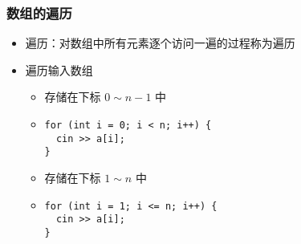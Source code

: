 
\begin{frame}[fragile]
    \frametitle{数组的遍历}

    \begin{overlayarea}{\textwidth}{.66\textheight}
        \begin{itemize}
            \item 遍历：对数组中所有元素逐个访问一遍的过程称为遍历

            \item 遍历输入数组

                \begin{itemize}
                    \item<1-> 存储在下标 $0 \sim n - 1$ 中
                    \item<1-> \lstinline|for (int i = 0; i < n; i++) {|\\
                        \lstinline|  cin >> a[i];|\\
                        \lstinline|}|
                    \item<2-> 存储在下标 $1 \sim n$ 中
                    \item<2-> \lstinline|for (int i = 1; i <= n; i++) {|\\
                        \lstinline|  cin >> a[i];|\\
                        \lstinline|}|
                \end{itemize}

        \end{itemize}
    \end{overlayarea}
\end{frame}


